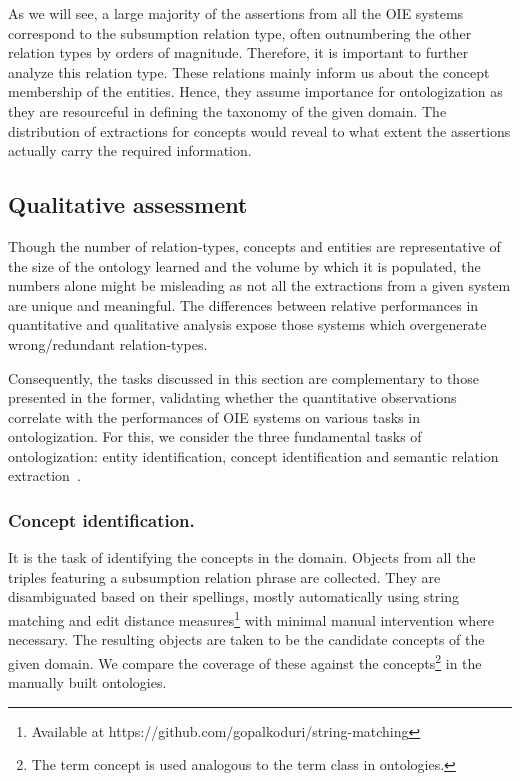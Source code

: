 \documentclass{llncs}
\begin{document}
As we will see, a large majority of the assertions from all the OIE systems correspond to the subsumption relation type, often outnumbering the other relation types by orders of magnitude. Therefore, it is important to further analyze this relation type. These relations mainly inform us about the concept membership of the entities. Hence, they assume importance for ontologization as they are resourceful in defining the taxonomy of the given domain. The distribution of extractions for concepts would reveal to what extent the assertions actually carry the required information.

\subsection{Qualitative assessment}
Though the number of relation-types, concepts and entities are representative of the size of the ontology learned and the volume by which it is populated, the numbers alone might be misleading as not all the extractions from a given system are unique and meaningful. The differences between relative performances in quantitative and qualitative analysis expose those systems which overgenerate wrong/redundant relation-types.

Consequently, the tasks discussed in this section are complementary to those presented in the former, validating whether the quantitative observations correlate with the performances of OIE systems on various tasks in ontologization. For this, we consider the three fundamental tasks of ontologization: entity identification, concept identification and semantic relation extraction~\cite{Petasis2011}. 




\subsubsection{Concept identification.} It is the task of identifying the concepts in the domain. Objects from all the triples featuring a subsumption relation phrase are collected. They are disambiguated based on their spellings, mostly automatically using string matching and edit distance measures\footnote{Available at https://github.com/gopalkoduri/string-matching} with minimal manual intervention where necessary. The resulting objects are taken to be the candidate concepts of the given domain. We compare the coverage of these against the concepts\footnote{The term concept is used analogous to the term class in ontologies.} in the manually built ontologies.
\end{document}

